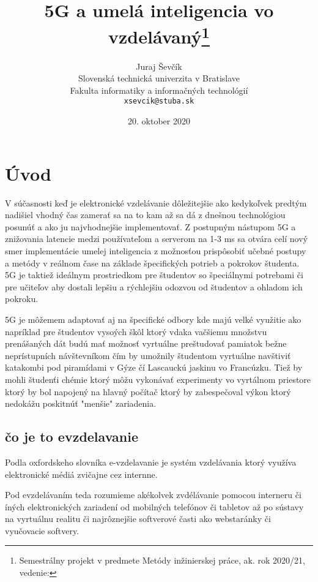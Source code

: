 \documentclass[12pt,sloak,a4paper]{article}
\title{5G a umelá inteligencia vo vzdelávaný\thanks{Semestrálny projekt v predmete Metódy inžinierskej práce, ak. rok 2020/21, vedenie:}}
\author{Juraj Ševčík\\[2pt]
	{\small Slovenská technická univerzita v Bratislave}\\
	{\small Fakulta informatiky a informačných technológií}\\
	{\small \texttt{xsevcik@stuba.sk}}
}
\date{\small 20. oktober 2020}
\begin{document}
\maketitle

\begin{abstract}


\end{abstract}
\newpage
\section{Úvod}
V súčasnosti  keď je elektronické vzdelávanie dôležitejšie ako kedykoľvek predtým nadišiel vhodný čas zamerať sa na to kam až sa dá z dnešnou technológiou posunúť a ako ju najvhodnejšie implementovať. Z postupným nástupom 5G a znižovania latencie medzi používateľom a serverom na 1-3 ms sa otvára celí nový smer implementácie umelej inteligencia z možnosťou prispôsobiť učebné postupy a metódy v reálnom čase na základe špecifických potrieb a pokrokov študenta. 5G je taktiež ideálnym prostriedkom pre študentov so špeciálnymi potrebami či pre učiteľov aby dostali lepšiu a rýchlejšiu odozvou od študentov a ohladom ich pokroku. 

5G je môžemem adaptovať aj na špecifické odbory kde majú velké využitie ako napríklad pre študentov vysoých škôl ktorý vdaka vačšiemu množstvu prenášaných dát budú mať možnosť vyrtuálne preštudovať pamiatok bežne neprístupních návštevníkom čím by umožnily študentom vyrtuálne navštiviť katakombi pod piramídami v Gýze čí Lascauckú jaskinu vo Francúzku. Tiež by mohli študenťi chémie ktorý môžu vykonávať experimenty vo vyrtálnom priestore ktorý by bol napojený na hlavný počítač ktorý by zabespečoval výkon ktorý nedokážu poskitnúť "menšie" zariadenia.



\subsection{čo je to evzdelavanie}
Podla oxfordskeho slovníka e-vzdelavanie je systém vzdelávania ktorý využíva elektronické médiá zvičajne cez internne. 

Pod evzdelávaním teda rozumieme akékolvek zvdélávanie pomocou interneru či íných elektronických zariadení od mobilných telefónov či tabletov až po sústavy na vyrtuálnu realitu či najrôznejšie softverové časti ako webstaránky či vyučovacie softvery. 
\end{document}
